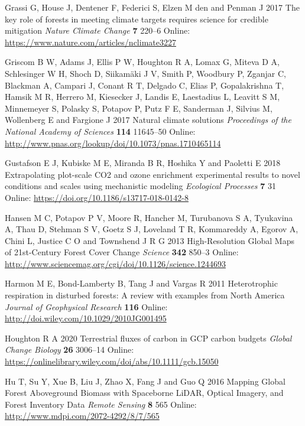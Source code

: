 \documentclass[
]{article}
\newlength{\cslhangindent}
\newenvironment{cslreferences}%
  {\setlength{\parindent}{0pt}%
  \everypar{\setlength{\hangindent}{\cslhangindent}}\ignorespaces}%
  {\par}
\begin{document}
\begin{cslreferences}
\leavevmode\hypertarget{ref-grassi_key_2017}{}%
Grassi G, House J, Dentener F, Federici S, Elzen M den and Penman J 2017
The key role of forests in meeting climate targets requires science for
credible mitigation \emph{Nature Climate Change} \textbf{7} 220--6
Online: \url{https://www.nature.com/articles/nclimate3227}

\leavevmode\hypertarget{ref-griscom_natural_2017}{}%
Griscom B W, Adams J, Ellis P W, Houghton R A, Lomax G, Miteva D A,
Schlesinger W H, Shoch D, Siikamäki J V, Smith P, Woodbury P, Zganjar C,
Blackman A, Campari J, Conant R T, Delgado C, Elias P, Gopalakrishna T,
Hamsik M R, Herrero M, Kiesecker J, Landis E, Laestadius L, Leavitt S M,
Minnemeyer S, Polasky S, Potapov P, Putz F E, Sanderman J, Silvius M,
Wollenberg E and Fargione J 2017 Natural climate solutions
\emph{Proceedings of the National Academy of Sciences} \textbf{114}
11645--50 Online:
\url{http://www.pnas.org/lookup/doi/10.1073/pnas.1710465114}

\leavevmode\hypertarget{ref-gustafson_extrapolating_2018}{}%
Gustafson E J, Kubiske M E, Miranda B R, Hoshika Y and Paoletti E 2018
Extrapolating plot-scale CO2 and ozone enrichment experimental results
to novel conditions and scales using mechanistic modeling
\emph{Ecological Processes} \textbf{7} 31 Online:
\url{https://doi.org/10.1186/s13717-018-0142-8}

\leavevmode\hypertarget{ref-hansen_high-resolution_2013}{}%
Hansen M C, Potapov P V, Moore R, Hancher M, Turubanova S A, Tyukavina
A, Thau D, Stehman S V, Goetz S J, Loveland T R, Kommareddy A, Egorov A,
Chini L, Justice C O and Townshend J R G 2013 High-Resolution Global
Maps of 21st-Century Forest Cover Change \emph{Science} \textbf{342}
850--3 Online:
\url{http://www.sciencemag.org/cgi/doi/10.1126/science.1244693}

\leavevmode\hypertarget{ref-harmon_heterotrophic_2011}{}%
Harmon M E, Bond-Lamberty B, Tang J and Vargas R 2011 Heterotrophic
respiration in disturbed forests: A review with examples from North
America \emph{Journal of Geophysical Research} \textbf{116} Online:
\url{http://doi.wiley.com/10.1029/2010JG001495}

\leavevmode\hypertarget{ref-houghton_terrestrial_2020}{}%
Houghton R A 2020 Terrestrial fluxes of carbon in GCP carbon budgets
\emph{Global Change Biology} \textbf{26} 3006--14 Online:
\url{https://onlinelibrary.wiley.com/doi/abs/10.1111/gcb.15050}

\leavevmode\hypertarget{ref-hu_mapping_2016}{}%
Hu T, Su Y, Xue B, Liu J, Zhao X, Fang J and Guo Q 2016 Mapping Global
Forest Aboveground Biomass with Spaceborne LiDAR, Optical Imagery, and
Forest Inventory Data \emph{Remote Sensing} \textbf{8} 565 Online:
\url{http://www.mdpi.com/2072-4292/8/7/565}


\end{cslreferences}
\end{document}
